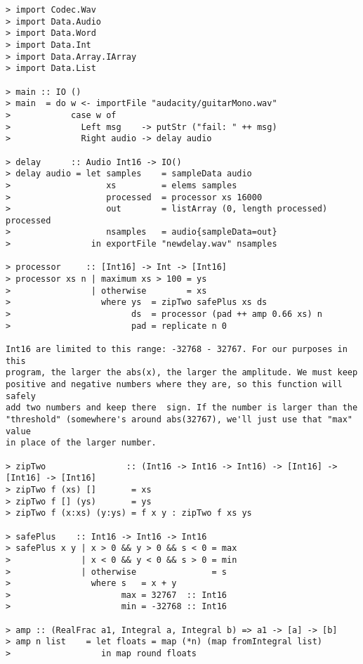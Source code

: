 \documentclass[12pt]{article}
\begin{document}
\begin{verbatim}
> import Codec.Wav
> import Data.Audio
> import Data.Word
> import Data.Int
> import Data.Array.IArray
> import Data.List

> main :: IO ()
> main  = do w <- importFile "audacity/guitarMono.wav"
>            case w of
>              Left msg    -> putStr ("fail: " ++ msg)
>              Right audio -> delay audio

> delay      :: Audio Int16 -> IO()
> delay audio = let samples    = sampleData audio
>                   xs         = elems samples
>                   processed  = processor xs 16000
>                   out        = listArray (0, length processed) processed
>                   nsamples   = audio{sampleData=out}
>                in exportFile "newdelay.wav" nsamples

> processor     :: [Int16] -> Int -> [Int16]
> processor xs n | maximum xs > 100 = ys
>                | otherwise        = xs
>                  where ys  = zipTwo safePlus xs ds
>                        ds  = processor (pad ++ amp 0.66 xs) n
>                        pad = replicate n 0

Int16 are limited to this range: -32768 - 32767. For our purposes in this
program, the larger the abs(x), the larger the amplitude. We must keep
positive and negative numbers where they are, so this function will safely
add two numbers and keep there  sign. If the number is larger than the
"threshold" (somewhere's around abs(32767), we'll just use that "max" value
in place of the larger number.

> zipTwo                :: (Int16 -> Int16 -> Int16) -> [Int16] -> [Int16] -> [Int16]
> zipTwo f (xs) []       = xs
> zipTwo f [] (ys)       = ys
> zipTwo f (x:xs) (y:ys) = f x y : zipTwo f xs ys

> safePlus    :: Int16 -> Int16 -> Int16
> safePlus x y | x > 0 && y > 0 && s < 0 = max
>              | x < 0 && y < 0 && s > 0 = min
>              | otherwise               = s
>                where s   = x + y
>                      max = 32767  :: Int16
>                      min = -32768 :: Int16

> amp :: (RealFrac a1, Integral a, Integral b) => a1 -> [a] -> [b]
> amp n list    = let floats = map (*n) (map fromIntegral list)
>                  in map round floats
\end{verbatim}
\end{document}
